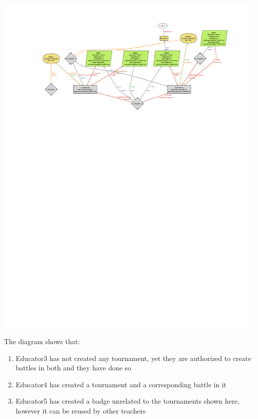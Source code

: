 \begin{enumerate}[label=,leftmargin=0cm]
            \begin{adjustbox}{max size={\textwidth}{\textheight}}
                  \includegraphics[trim=90 525 60 40, clip]{alloy/manage_tournaments.pdf}
            \end{adjustbox}

            The diagram shows that:
            \begin{enumerate}
                  \item Educator3 has not created any tournament, yet they are authorized
                        to create battles in both and they have done so
                  \item Educator4 has created a tournament and a corresponding battle in it
                  \item Educator5 has created a badge unrelated to the tournaments shown here,
                        however it can be reused by other teachers
            \end{enumerate}
\end{enumerate}